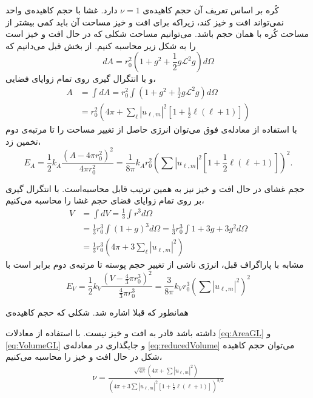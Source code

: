 
 کُره‌ بر اساس تعریف آن حجم کاهیده‌ی 
 $\nu=1$
 دارد. غشا با حجم کاهیده‌ی واحد نمی‌تواند افت و خیز کند، زیراکه برای افت و خیز مساحت آن باید کمی بیشتر از مساحت کُره با همان حجم باشد. می‌توانیم مساحت شکلی که در حال افت و خیز است را به شکل زیر محاسبه کنیم. از بخش قبل می‌دانیم که
\begin{equation}
dA=r_{0}^2(1+g^2+\frac{1}{2}g\mathcal{L}^2g)d\Omega
\label{eq:areaPatchDifferential}
\end{equation}
 و با انتگرال گیری روی تمام زوایای فضایی،
 \begin{equation}
\begin{aligned}
A&=\int dA=r_{0}^2\int(1+g^2+\frac{1}{2}g\mathcal{L}^2g)d\Omega\\
&=r_{0}^2(4\pi+\sum_{\ell}|u_{\ell,m}|^2[1+\frac{1}{2}\ell(\ell+1)])
\label{eq:AreaGL}
\end{aligned}
\end{equation}
با استفاده از معادله‌ی فوق می‌توان انرژی حاصل از تغییر مساحت را تا مرتبه‌ی دوم تخمین زد،
\begin{equation}
E_A=\frac{1}{2}k_A\frac{(A-4\pi r_{0}^2)^2}{4\pi r_{0}^2}=\frac{1}{8\pi}k_A r_{0}^2(\sum|u_{\ell,m}|^2[1+\frac{1}{2}\ell(\ell+1)])^2.
\label{eq:AreaGLFluctuationAmplitude}
\end{equation}


 حجم غشای در حال افت و خیز نیز به همین ترتیب قابل محاسبه‌است. با انتگرال گیری بر روی تمام زوایای فضای حجم غشا را محاسبه می‌کنیم،
\begin{equation}
\begin{aligned}
V&=\int dV=\frac{1}{3}\int r^3d\Omega\\
&=\frac{1}{3}r_{0}^3\int(1+g)^3d\Omega=\frac{1}{3}r_{0}^3\int1+3g+3g^2d\Omega\\
&=\frac{1}{3}r_{0}^3(4\pi+3\sum_{\ell}|u_{\ell,m}|^2)
\label{eq:VolumeGL}
\end{aligned}
\end{equation}
مشابه با پاراگراف قبل، انرژی ناشی از تغییر حجم پوسته تا مرتبه‌ی دوم برابر است با
\begin{equation}
E_V=\frac{1}{2}k_V\frac{(V-\frac{4}{3}\pi r_{0}^3)^2}{\frac{4}{3}\pi r_{0}^3}= \frac{3}{8\pi}k_Vr_{0}^3(\sum|u_{\ell,m}|^2)^2
\label{eq:VolumeGLFluctuationAmplitude}
\end{equation}



همانطور که قبلا اشاره شد. شکلی که حجم کاهیده‌ی 

داشته باشد قادر به افت و خیز نیست.  با استفاده از معادلات
\ref{eq:AreaGL}
و
\ref{eq:VolumeGL}
و جایگذاری در معادله‌ی
\ref{eq:reducedVolume}
می‌توان حجم کاهیده شکل در حال افت و خیز  را محاسبه می‌کنیم،
\begin{equation}
\begin{aligned}
\nu=\frac{\sqrt{4\pi}(4\pi+\sum|u_{\ell,m}|^2)}{(4\pi+3\sum|u_{\ell,m}|^2[1+\frac{1}{2}\ell(\ell+1)])^{3/2}}
\label{eq:nuUndulated}
\end{aligned}
\end{equation}
